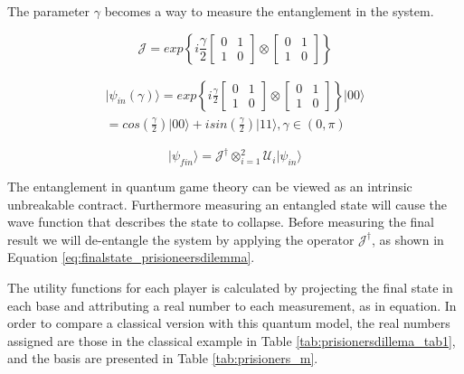 The parameter $\gamma$ becomes a way to measure the entanglement in the system\cite{Eisert2008}.

\begin{equation}
\label{eq:matrix_exponencial_esoterica}
\mathcal{J}=exp\left\{ i\frac{\gamma}{2}\left[\begin{array}{cc}
0 & 1\\
1 & 0
\end{array}\right]\otimes\left[\begin{array}{cc}
0 & 1\\
1 & 0
\end{array}\right]\right\}
\end{equation} 

\begin{equation}
\label{eq:estado_inicial_prisioneiro}
\begin{split}
\vert\psi_{in}(\gamma)\rangle=exp\left\{ i\frac{\gamma}{2}\left[\begin{array}{cc}
0 & 1\\
1 & 0
\end{array}\right]\otimes\left[\begin{array}{cc}
0 & 1\\
1 & 0
\end{array}\right]\right\} \vert00\rangle \\
=cos(\frac{\gamma}{2})\vert00\rangle+isin(\frac{\gamma}{2})\vert11\rangle,\gamma\in(0,\pi)
\end{split}
\end{equation}

\begin{equation}
\vert\psi_{fin}\rangle= \mathcal{J}^{\dagger} \otimes_{i=1}^{2}\mathcal{U}_{i}\vert\psi_{in}\rangle
\label{eq:finalstate_prisioneersdilemma}
\end{equation}

The entanglement in quantum game theory can be viewed as an intrinsic unbreakable contract. Furthermore measuring an entangled state will cause the wave function that describes the state to collapse. Before measuring the final result we will de-entangle the system by applying the operator $\mathcal{J}^{\dagger}$, as shown in Equation \ref{eq:finalstate_prisioneersdilemma}.



The utility functions for each player is calculated by projecting the final state in each base and attributing a real number to each measurement, as in equation.
In order to compare a classical version with this quantum model, the real numbers assigned are those in the classical example in Table \ref{tab:prisionersdillema_tab1}, and the basis are presented in Table \ref{tab:prisioners_m}.

